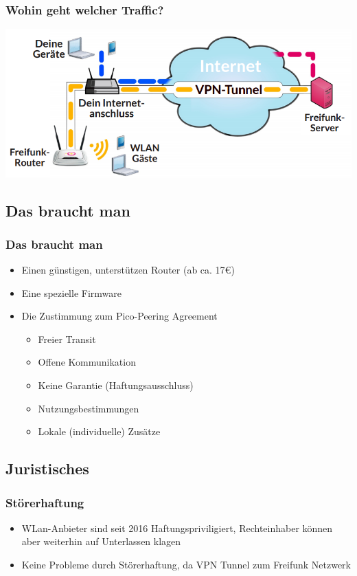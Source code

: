 \begin{frame}
\frametitle{Wohin geht welcher Traffic?}
	\includegraphics[scale=0.4]{images/personal_setup.png}
\end{frame}

\subsection{Das braucht man}
\begin{frame}
\frametitle{Das braucht man}
\begin{itemize}
\item Einen günstigen, unterstützen Router (ab ca. 17\euro)
\item Eine spezielle Firmware
\item Die Zustimmung zum \glqq Pico-Peering Agreement\grqq \footnotemark[1]
\begin{itemize}
\item Freier Transit
\item Offene Kommunikation
\item Keine Garantie (Haftungsausschluss)
\item Nutzungsbestimmungen
\item Lokale (individuelle) Zusätze
\end{itemize}
\end{itemize}
\end{frame}

\subsection{Juristisches}

\begin{frame}
\frametitle{Störerhaftung}
	\begin{itemize}
		\item WLan-Anbieter sind seit 2016 Haftungspriviligiert, Rechteinhaber können aber weiterhin auf Unterlassen klagen
		\item Keine Probleme durch Störerhaftung, da VPN Tunnel zum Freifunk Netzwerk
	\end{itemize}
\end{frame}
